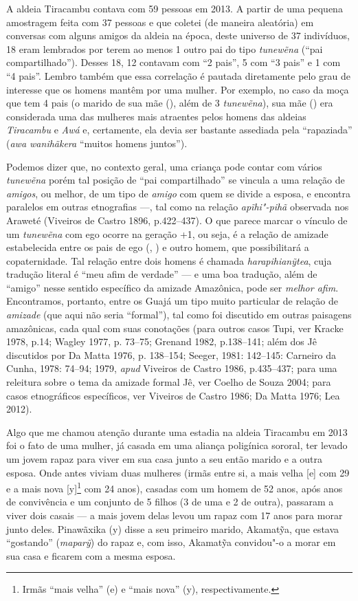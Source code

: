 A aldeia Tiracambu contava com 59 pessoas em 2013. A partir de uma
pequena amostragem feita com 37 pessoas e que coletei (de maneira
aleatória) em conversas com alguns amigos da aldeia na época, deste
universo de 37 indivíduos, 18 eram lembrados por terem ao menos 1 outro
pai do tipo \emph{tunewẽna} (``pai compartilhado''). Desses 18, 12
contavam com ``2 pais'', 5 com ``3 pais'' e 1 com ``4 pais''. Lembro
também que essa correlação é pautada diretamente pelo grau de interesse
que os homens mantêm por uma mulher. Por exemplo, no caso da moça que
tem 4 pais (o marido de sua mãe (), além de 3 \emph{tunewẽna}), sua mãe
() era considerada uma das mulheres mais atraentes pelos homens das
aldeias \emph{Tiracambu} e \emph{Awá} e, certamente, ela devia ser
bastante assediada pela ``rapaziada'' (\emph{awa wanihãkera} ``muitos
homens juntos'').

Podemos dizer que, no contexto geral, uma criança pode contar com vários
\emph{tunewẽna} porém tal posição de ``pai compartilhado'' se vincula a
uma relação de \emph{amigos}, ou melhor, de um tipo de \emph{amigo} com
quem se divide a esposa, e encontra paralelos em outras etnografias ---,
tal como na relação \emph{apĩhi"-pihã} observada nos Araweté (Viveiros de
Castro 1896, p.422--437). O que parece marcar o vínculo de um
\emph{tunewẽna} com ego ocorre na geração +1, ou seja, é a relação de
amizade estabelecida entre os pais de ego (, ) e outro homem, que
possibilitará a copaternidade. Tal relação entre dois homens é chamada
\emph{harapihianỹtea}, cuja tradução literal é ``meu afim de verdade'' ---
e uma boa tradução, além de ``amigo'' nesse sentido específico da
amizade Amazônica, pode ser \emph{melhor afim}. Encontramos, portanto,
entre os Guajá um tipo muito particular de relação de \emph{amizade}
(que aqui não seria ``formal''), tal como foi discutido em outras
paisagens amazônicas, cada qual com suas conotações (para outros casos
Tupi, ver Kracke 1978, p.14; Wagley 1977, p. 73--75; Grenand 1982,
p.138--141; além dos Jê discutidos por Da Matta 1976, p. 138--154; Seeger,
1981: 142--145: Carneiro da Cunha, 1978: 74--94; 1979, \emph{apud} Viveiros de
Castro 1986, p.435--437; para uma releitura sobre o tema da amizade
formal Jê, ver Coelho de Souza 2004; para casos etnográficos
específicos, ver Viveiros de Castro 1986; Da Matta 1976; Lea 2012).

Algo que me chamou atenção durante uma estadia na aldeia Tiracambu em
2013 foi o fato de uma mulher, já casada em uma aliança poligínica
sororal, ter levado um jovem rapaz para viver em sua casa junto a seu
então marido e a outra esposa. Onde antes viviam duas mulheres (irmãs
entre si, a mais velha [e] com 29 e a mais nova [y]\footnote{Irmãs
  ``mais velha'' (e) e ``mais nova'' (y), respectivamente.} com 24
anos), casadas com um homem de 52 anos, após anos de convivência e um
conjunto de 5 filhos (3 de uma e 2 de outra), passaram a viver dois
casais --- a mais jovem delas levou um rapaz com 17 anos para morar junto
deles. Pinawãxika (y) disse a seu primeiro marido, Akamatỹa, que estava
``gostando'' (\emph{maparỹ}) do rapaz e, com isso, Akamatỹa convidou"-o a
morar em sua casa e ficarem com a mesma esposa.

